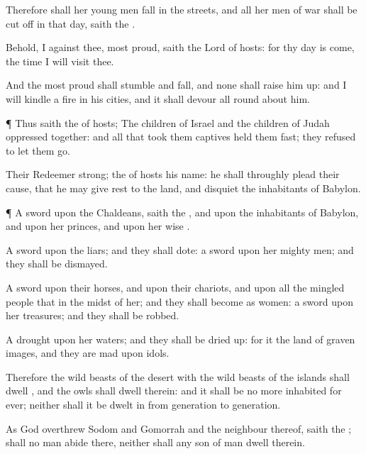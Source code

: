 {Therefore shall her young
men
fall in the
streets, and all her
men of
war shall be cut
off in that
day,
saith the
{}.

Behold, I
{} against thee,
{} most
proud,
saith the
Lord
{} of
hosts: for thy
day is
come, the
time
{} I will
visit thee.

And the most
proud shall
stumble and
fall, and none shall raise him
up: and I will
kindle a
fire in his
cities, and it shall
devour all round
about him.


\par }{\PP {}¶ Thus
saith the
{} of
hosts; The
children of
Israel and the
children of
Judah
{}
oppressed
together: and all that took them
captives held them
fast; they
refused to let them
go.

Their
Redeemer
{}
strong; the
{} of
hosts
{} his
name: he shall
throughly
plead their
cause, that he may give
rest to the
land, and
disquiet the
inhabitants of
Babylon.


\par }{\PP {}¶ A
sword
{} upon the
Chaldeans,
saith the
{}, and upon the
inhabitants of
Babylon, and upon her
princes, and upon her
wise
{}.

A
sword
{} upon the
liars; and they shall
dote: a
sword
{} upon her mighty
men; and they shall be
dismayed.

A
sword
{} upon their
horses, and upon their
chariots, and upon all the mingled
people that
{} in the
midst of her; and they shall become as
women: a
sword
{} upon her
treasures; and they shall be
robbed.

A
drought
{} upon her
waters; and they shall be dried
up: for it
{} the
land of graven
images, and they are
mad upon
{}
idols.

Therefore the wild beasts of the
desert with the wild beasts of the
islands shall
dwell
{}, and the
owls shall
dwell therein: and it shall be no more
inhabited for
ever; neither shall it be
dwelt in from
generation to
generation.

As
God
overthrew
Sodom and
Gomorrah and the
neighbour
{} thereof,
saith the
{};
{} shall no
man
abide there, neither shall any
son of
man
dwell therein.

}
